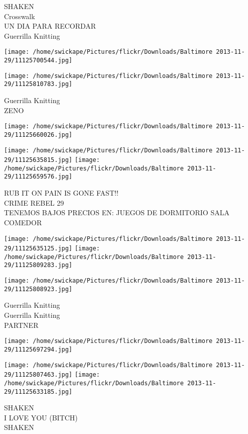 \documentclass[10pt,letterpaper]{article}
\begin{document}
SHAKEN\\
Crosswalk\\
UN DIA PARA RECORDAR\\
Guerrilla Knitting
\pagebreak

\texttt{[image: /home/swickape/Pictures/flickr/Downloads/Baltimore 2013-11-29/11125700544.jpg]}

\vspace{0.25in}
\texttt{[image: /home/swickape/Pictures/flickr/Downloads/Baltimore 2013-11-29/11125810783.jpg]}

Guerrilla Knitting\\
ZENO
\pagebreak

\texttt{[image: /home/swickape/Pictures/flickr/Downloads/Baltimore 2013-11-29/11125660026.jpg]}

\vspace{0.25in}
\texttt{[image: /home/swickape/Pictures/flickr/Downloads/Baltimore 2013-11-29/11125635815.jpg]}
\texttt{[image: /home/swickape/Pictures/flickr/Downloads/Baltimore 2013-11-29/11125659576.jpg]}

RUB IT ON PAIN IS GONE FAST!!\\
CRIME REBEL 29\\
TENEMOS BAJOS PRECIOS EN: JUEGOS DE DORMITORIO SALA COMEDOR
\pagebreak

\texttt{[image: /home/swickape/Pictures/flickr/Downloads/Baltimore 2013-11-29/11125635125.jpg]}
\texttt{[image: /home/swickape/Pictures/flickr/Downloads/Baltimore 2013-11-29/11125809283.jpg]}

\texttt{[image: /home/swickape/Pictures/flickr/Downloads/Baltimore 2013-11-29/11125808923.jpg]}

Guerrilla Knitting\\
Guerrilla Knitting\\
PARTNER
\pagebreak

\texttt{[image: /home/swickape/Pictures/flickr/Downloads/Baltimore 2013-11-29/11125697294.jpg]}

\vspace{0.25in}
\texttt{[image: /home/swickape/Pictures/flickr/Downloads/Baltimore 2013-11-29/11125807463.jpg]}
\texttt{[image: /home/swickape/Pictures/flickr/Downloads/Baltimore 2013-11-29/11125633185.jpg]}

SHAKEN\\
I LOVE YOU (BITCH)\\
SHAKEN
\pagebreak
\end{document}
